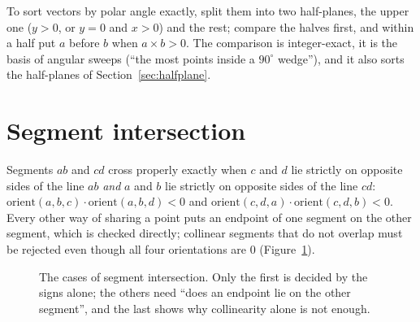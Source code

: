 \begin{trick}
To sort vectors by polar angle exactly, split them into two half-planes, the upper one ($y > 0$, or $y = 0$ and $x > 0$) and the rest;
compare the halves first, and within a half put $a$ before $b$ when $a \times b > 0$. The comparison is integer-exact, it is the basis of
angular sweeps (``the most points inside a $90^\circ$ wedge''), and it also sorts the half-planes of Section~\ref{sec:halfplane}.
\end{trick}

\section[Segment intersection]{Segment intersection \hfill \gold}\label{sec:segments}

Segments $ab$ and $cd$ cross properly exactly when $c$ and $d$ lie strictly on opposite sides of the line $ab$ \emph{and} $a$ and $b$ lie
strictly on opposite sides of the line $cd$: $\mathrm{orient}(a, b, c) \cdot \mathrm{orient}(a, b, d) < 0$ and $\mathrm{orient}(c, d, a)
\cdot \mathrm{orient}(c, d, b) < 0$. Every other way of sharing a point puts an endpoint of one segment on the other segment, which is
checked directly; collinear segments that do not overlap must be rejected even though all four orientations are 0
(Figure~\ref{fig:seginter}).

\begin{figure}[htbp]
\centering
{}
\caption{The cases of segment intersection. Only the first is decided by the signs alone; the others need ``does an endpoint lie on the
other segment'', and the last shows why collinearity alone is not enough.}
\label{fig:seginter}
\end{figure}

